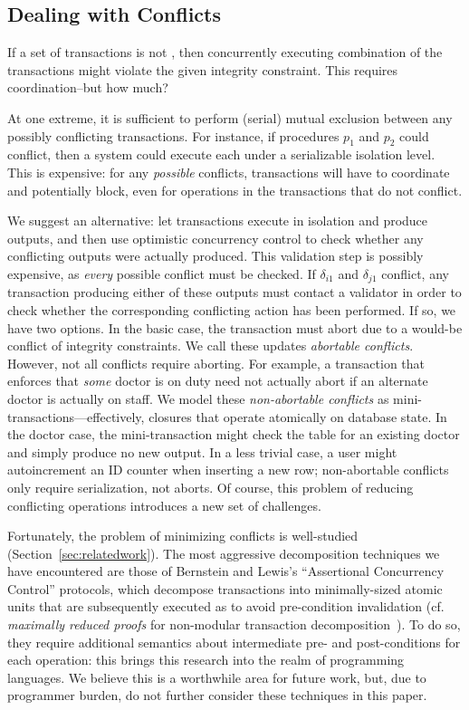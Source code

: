 \subsection{Dealing with Conflicts}
\label{sec:conflicts}

If a set of transactions is not \iconfluent, then concurrently
executing combination of the transactions might violate the given
integrity constraint. This requires coordination--but how much?

At one extreme, it is sufficient to perform (serial) mutual exclusion
between any possibly conflicting transactions. For instance, if
procedures $p_1$ and $p_2$ could conflict, then a system could execute
each under a serializable isolation level. This is expensive: for any
\textit{possible} conflicts, transactions will have to coordinate and
potentially block, even for operations in the transactions that do not
conflict.

We suggest an alternative: let transactions execute in isolation and
produce outputs, and then use optimistic concurrency control to check
whether any conflicting outputs were actually produced. This
validation step is possibly expensive, as \textit{every} possible
conflict must be checked. If $\delta_{i1}$ and $\delta_{j1}$ conflict,
any transaction producing either of these outputs must contact a
validator in order to check whether the corresponding conflicting
action has been performed. If so, we have two options. In the basic
case, the transaction must abort due to a would-be conflict of
integrity constraints. We call these updates \textit{abortable
  conflicts}. However, not all conflicts require aborting. For
example, a transaction that enforces that \textit{some} doctor is on
duty need not actually abort if an alternate doctor is actually on
staff. We model these \textit{non-abortable conflicts} as
mini-transactions---effectively, closures that operate atomically on
database state. In the doctor case, the mini-transaction might check
the table for an existing doctor and simply produce no new output. In
a less trivial case, a user might autoincrement an ID counter when
inserting a new row; non-abortable conflicts only require
serialization, not aborts. Of course, this problem of reducing
conflicting operations introduces a new set of challenges.

Fortunately, the problem of minimizing conflicts is well-studied
(Section~\ref{sec:relatedwork}). The most aggressive decomposition
techniques we have encountered are those of Bernstein and Lewis's
``Assertional Concurrency Control'' protocols, which decompose
transactions into minimally-sized atomic units that are subsequently
executed as to avoid pre-condition invalidation (cf. \textit{maximally
  reduced proofs} for non-modular transaction
decomposition~\cite{decomp-semantics}). To do so, they require
additional semantics about intermediate pre- and post-conditions for
each operation: this brings this research into the realm of
programming languages. We believe this is a worthwhile area for future
work, but, due to programmer burden, do not further consider these
techniques in this paper.

